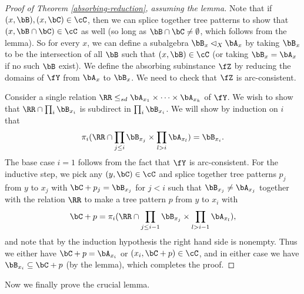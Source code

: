 \begin{proof}[Proof of Theorem \ref{absorbing-reduction}, assuming the lemma] Note that if $(x,\bB), (x,\bC) \in \cC$, then we can splice together tree patterns to show that $(x,\bB\cap\bC) \in \cC$ as well (so long as $\bB \cap \bC \ne \emptyset$, which follows from the lemma). So for every $x$, we can define a subalgebra $\bB_x \lhd_X \bA_x$ by taking $\bB_x$ to be the intersection of all $\bB$ such that $(x,\bB) \in \cC$ (or taking $\bB_x = \bA_x$ if no such $\bB$ exist). We define the absorbing subinstance $\fZ$ by reducing the domains of $\fY$ from $\bA_x$ to $\bB_x$. We need to check that $\fZ$ is arc-consistent.

Consider a single relation $\RR \le_{sd} \bA_{x_1} \times \cdots \times \bA_{x_k}$ of $\fY$. We wish to show that $\RR\cap \prod_i \bB_{x_i}$ is subdirect in $\prod_i \bB_{x_i}$. We will show by induction on $i$ that
\[
\pi_i(\RR \cap \prod_{j\le i} \bB_{x_j} \times \prod_{l > i} \bA_{x_l}) = \bB_{x_i}.
\]
The base case $i=1$ follows from the fact that $\fY$ is arc-consistent. For the inductive step, we pick any $(y,\bC) \in \cC$ and splice together tree patterns $p_j$ from $y$ to $x_j$ with $\bC + p_j = \bB_{x_j}$ for $j < i$ such that $\bB_{x_j} \ne \bA_{x_j}$ together with the relation $\RR$ to make a tree pattern $p$ from $y$ to $x_i$ with
\[
\bC + p = \pi_i(\RR \cap \prod_{j \le i-1} \bB_{x_j} \times \prod_{l > i-1} \bA_{x_l}),
\]
and note that by the induction hypothesis the right hand side is nonempty. Thus we either have $\bC + p = \bA_{x_i}$ or $(x_i,\bC+p) \in \cC$, and in either case we have $\bB_{x_i} \subseteq \bC+p$ (by the lemma), which completes the proof.
\end{proof}

Now we finally prove the crucial lemma.

